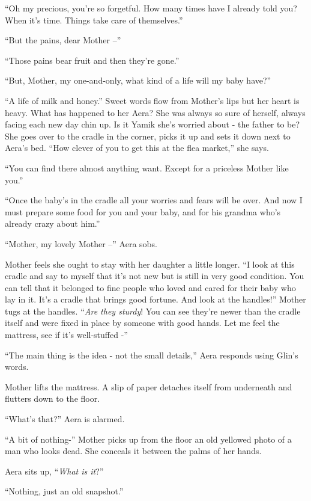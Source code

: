 \documentclass[twoside,11pt]{book}
\begin{document}
``Oh my precious, you're so forgetful. How many times have I already told you? When it's time. Things take
care of themselves.''

``But the pains, dear Mother --''

``Those pains bear fruit and then they're gone.''

``But, Mother, my one-and-only, what kind of a life will my baby have?''

``A life of milk and honey.'' Sweet words flow from Mother's lips but her heart is heavy. What
 has happened to her Aera? She was always so sure of herself, always facing each new day chin up. Is it Yamik she's
worried about - the father to be? She goes over to the cradle in the corner, picks it up and sets it down next to
Aera's bed. ``How clever of you to get this at the flea market,'' she says.

``You can find there almost anything want. Except for a priceless Mother like you.''

``Once the baby's in the cradle all your worries and fears will be over. And now I must prepare some food
for you and your baby, and for his grandma who's already crazy about him.''

``Mother, my lovely Mother --'' Aera sobs.

Mother feels she ought to stay with her daughter a little longer. ``I look at this cradle and say to myself
that it's not new but is still in very good condition. You can tell that it belonged to fine people
who loved and cared for their baby who lay in it. It's a cradle that brings good fortune. And look at the
handles!'' Mother tugs at the handles. ``\textit{Are they sturdy}! You can see they're newer
than the cradle itself and were fixed in place by someone with good hands. Let me feel the mattress, see if it's
well-stuffed -''

``The main thing is the idea - not the small details,'' Aera responds using Glin's words.

Mother lifts the mattress. A slip of paper detaches itself from underneath and flutters down to the
floor.

``What's that?'' Aera is alarmed.

``A bit of nothing-'' Mother picks up from the floor an old yellowed photo of a man who looks
dead. She conceals it between the palms of her hands.

Aera sits up, ``\textit{What is it}?''

``Nothing, just an old snapshot.''
\end{document}
